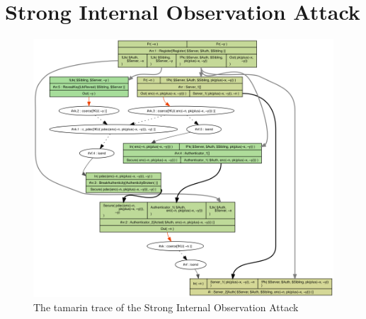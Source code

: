 \chapter{Strong Internal Observation Attack}\label{ch:attack}
\begin{figure}[h]
    \centering
    \begin{wide}
    \includegraphics[width=\linewidth]{gfx/attack}
    \end{wide}
    \caption[Tamarin trace of SIO attack]{The tamarin trace of the Strong Internal Observation Attack}
    \label{fig:my_label}
\end{figure}